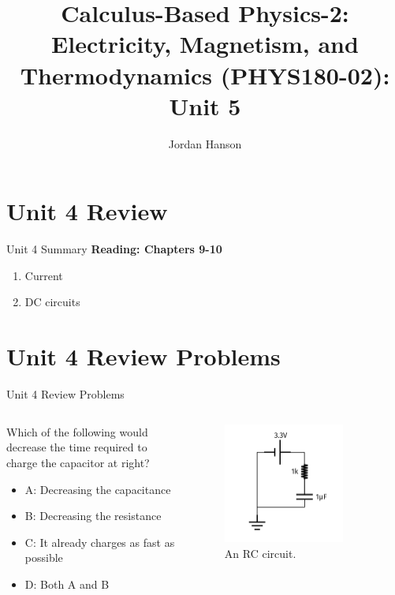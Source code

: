 \documentclass{beamer}
\title{Calculus-Based Physics-2: Electricity, Magnetism, and Thermodynamics (PHYS180-02): Unit 5}
\author{Jordan Hanson}
\institute{Whittier College Department of Physics and Astronomy}
\begin{document}
\maketitle

\section{Unit 4 Review}

\begin{frame}{Unit 4 Summary}
\textbf{Reading: Chapters 9-10}
\begin{enumerate}
\item Current
\item DC circuits
\end{enumerate}
\end{frame}

\section{Unit 4 Review Problems}

\begin{frame}{Unit 4 Review Problems}
\begin{columns}[T]
\begin{column}{0.5\textwidth}
Which of the following would decrease the time required to charge the capacitor at right?
\begin{itemize}
\item A: Decreasing the capacitance
\item B: Decreasing the resistance
\item C: It already charges as fast as possible
\item D: Both A and B
\end{itemize}
\end{column}
\begin{column}{0.5\textwidth}
\begin{figure}
\centering
\includegraphics[width=0.8\textwidth]{figures/iVCurve7.pdf}
\caption{\label{fig:RC0} An RC circuit.}
\end{figure}
\end{column}
\end{columns}
\end{frame}
\end{document}

